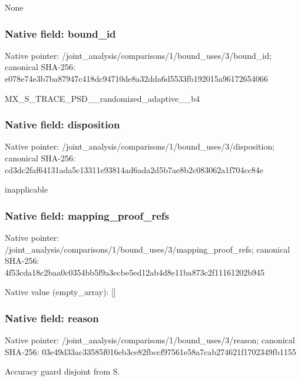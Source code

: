 \documentclass[10pt,a4paper]{article}
\begin{document}
\begingroup\raggedright\sloppy None\par\endgroup

\subsubsection{Native field: bound\_\allowbreak{}id}
Native pointer: /joint\_\allowbreak{}analysis/comparisons/1/bound\_\allowbreak{}uses/3/bound\_\allowbreak{}id; canonical SHA-256: e078e74e3b7ba87947c418dc94710de8a32dda6d5533fb192015a96172654066

\begingroup\raggedright\sloppy MX\_\allowbreak{}S\_\allowbreak{}TRACE\_\allowbreak{}PSD\_\allowbreak{}\_\allowbreak{}randomized\_\allowbreak{}adaptive\_\allowbreak{}\_\allowbreak{}b4\par\endgroup

\subsubsection{Native field: disposition}
Native pointer: /joint\_\allowbreak{}analysis/comparisons/1/bound\_\allowbreak{}uses/3/disposition; canonical SHA-256: cd3dc2faf64131ada5c13311e93814ad6ada2d5b7ae8b2c083062a1f704cc84e

\begingroup\raggedright\sloppy inapplicable\par\endgroup

\subsubsection{Native field: mapping\_\allowbreak{}proof\_\allowbreak{}refs}
Native pointer: /joint\_\allowbreak{}analysis/comparisons/1/bound\_\allowbreak{}uses/3/mapping\_\allowbreak{}proof\_\allowbreak{}refs; canonical SHA-256: 4f53cda18c2baa0c0354bb5f9a3ecbe5ed12ab4d8e11ba873c2f11161202b945

Native value (empty\_\allowbreak{}array): []

\subsubsection{Native field: reason}
Native pointer: /joint\_\allowbreak{}analysis/comparisons/1/bound\_\allowbreak{}uses/3/reason; canonical SHA-256: 03e49d33ac33585f016eb3ce82fbccf97561e58a7cab274621f1702349fb1155

\begingroup\raggedright\sloppy Accuracy guard disjoint from S.\par\endgroup
\end{document}
